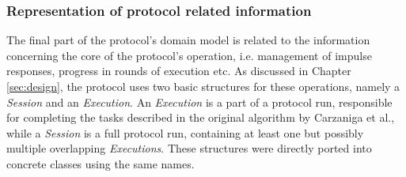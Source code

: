 \documentclass[a4paper,11pt,twoside]{report}
\begin{document}
\subsubsection*{Representation of protocol related information}

The final part of the protocol's domain model is related to the information concerning the core of the protocol's operation, i.e. management of impulse responses, progress in rounds of execution etc. As discussed in Chapter \ref{sec:design}, the protocol uses two basic structures for these operations, namely a \textit{Session} and an \textit{Execution}. An \textit{Execution} is a part of a protocol run, responsible for completing the tasks described in the original algorithm by Carzaniga et al., while  a \textit{Session} is a full protocol run, containing at least one but possibly multiple overlapping \textit{Executions}. These structures were directly ported into concrete classes using the same names.
\end{document}
